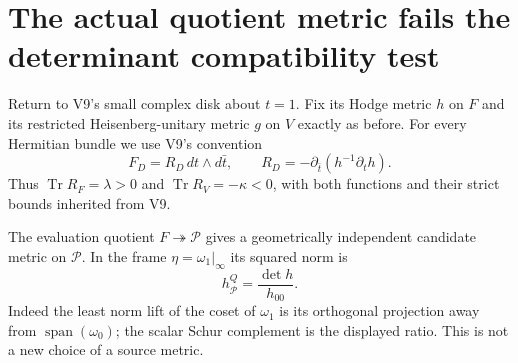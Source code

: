 \documentclass[11pt]{article}
\theoremstyle{definition}
\theoremstyle{remark}
\newcommand{\Span}{\operatorname{span}}
\begin{document}
\section{The actual quotient metric fails the determinant compatibility test}
\label{sec:v10-metrics}

Return to V9's small complex disk about $t=1$. Fix its Hodge metric $h$
on $F$ and its restricted Heisenberg-unitary metric $g$ on $V$ exactly as
before. For every Hermitian bundle we use V9's convention
\[
 F_D=R_D\,dt\wedge d\bar t,\qquad
 R_D=-\partial_{\bar t}(h^{-1}\partial_t h).
\]
Thus $\operatorname{Tr}R_F=\lambda>0$ and
$\operatorname{Tr}R_V=-\kappa<0$, with both functions and their
strict bounds inherited from V9.

The evaluation quotient $F\twoheadrightarrow\mathscr P$ gives a
geometrically independent candidate metric on $\mathscr P$. In the frame
$\eta=\omega_1|_\infty$ its squared norm is
\begin{equation}
 \boxed{h_{\mathscr P}^{Q}=\frac{\det h}{h_{00}}.}
 \label{eq:v10-quotient-metric}
\end{equation}
Indeed the least norm lift of the coset of $\omega_1$ is its orthogonal
projection away from $\Span(\omega_0)$; the scalar Schur complement is
the displayed ratio. This is not a new choice of a source metric.
\end{document}
